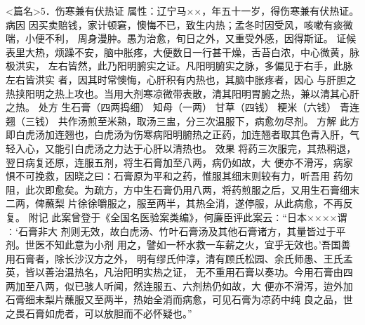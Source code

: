 \documentclass[a4paper,12pt,UTF8,twoside]{ctexbook}
\begin{document}
<篇名>5．伤寒兼有伏热证
属性：辽宁马××，年五十一岁，得伤寒兼有伏热证。 
病因 因买卖赔钱，家计顿窘，懊悔不已，致生内热；孟冬时因受风，咳嗽有痰微喘，小便不利， 
周身漫肿。愚为治愈，旬日之外，又重受外感，因得斯证。 
证候 表里大热，烦躁不安，脑中胀疼，大便数日一行甚干燥，舌苔白浓，中心微黄，脉极洪实， 
左右皆然，此乃阳明腑实之证。凡阳明腑实之脉，多偏见于右手，此脉左右皆洪实 
者，因其时常懊悔，心肝积有内热也，其脑中胀疼者，因心 
与肝胆之热挟阳明之热上攻也。当用大剂寒凉微带表散，清其阳明胃腑之热，兼以清其心肝之热。 
处方 生石膏（四两捣细） 知母（一两） 甘草（四钱） 粳米（六钱） 青连翘（三钱） 
共作汤煎至米熟，取汤三盅，分三次温服下，病愈勿尽剂。 
方解 此方即白虎汤加连翘也，白虎汤为伤寒病阳明腑热之正药，加连翘者取其色青入肝，气 
轻入心，又能引白虎汤之力达于心肝以清热也。 
效果 将药三次服完，其热稍退，翌日病复还原，连服五剂，将生石膏加至八两，病仍如故，大 
便亦不滑泻，病家惧不可挽救，因晓之曰∶石膏原为平和之药，惟服其细末则较有力，听吾用 
药勿阻，此次即愈矣。为疏方，方中生石膏仍用八两，将药煎服之后，又用生石膏细末二两，俾蘸梨 
片徐徐嚼服之，服至两半，其热全消，遂停服，从此病愈，不再反复。 
附记 此案曾登于《全国名医验案类编》，何廉臣评此案云∶“日本××××谓∶‘石膏非大 
剂则无效，故白虎汤、竹叶石膏汤及其他石膏诸方，其量皆过于平剂。世医不知此意为小剂 
用之，譬如一杯水救一车薪之火，宜乎无效也。’吾国善用石膏者，除长沙汉方之外， 
明有缪氏仲淳，清有顾氏松园、余氏师愚、王氏孟英，皆以善治温热名，凡治阳明实热之证， 
无不重用石膏以奏功。今用石膏由四两加至八两，似已骇人听闻，然连服五、六剂热仍如故，大 
便亦不滑泻，迨外加石膏细末梨片蘸服又至两半，热始全消而病愈，可见石膏为凉药中纯 
良之品，世之畏石膏如虎者，可以放胆而不必怀疑也。” 
\end{document}
